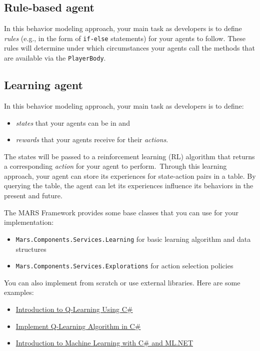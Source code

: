 \documentclass[a4paper,english,DIV=16,11pt,parskip=half,dvipsnames,listof=totoc,index=totoc,bibliography=totoc]{scrartcl}
\begin{document}
\subsection*{Rule-based agent}
In this behavior modeling approach, your main task as developers is to define \emph{rules} (e.g., in the form of \texttt{if-else} statements) for your agents to follow. These rules will determine under which circumstances your agents call the methods that are available via the \texttt{PlayerBody}.

\subsection*{Learning agent}
In this behavior modeling approach, your main task as developers is to define:
\begin{itemize}
  \item \emph{states} that your agents can be in and
  \item \emph{rewards} that your agents receive for their \emph{actions}.
\end{itemize}
The states will be passed to a reinforcement learning (RL) algorithm that returns a corresponding \emph{action} for your agent to perform.~Through this learning approach, your agent can store its experiences for state-action pairs in a table. By querying the table, the agent can let its experiences influence its behaviors in the present and future.

The MARS Framework provides some base classes that you can use for your implementation:
\begin{itemize}
  \item \texttt{Mars.Components.Services.Learning} for basic learning algorithm and data structures
  \item \texttt{Mars.Components.Services.Explorations} for action selection policies
\end{itemize}
You can also implement from scratch or use external libraries. Here are some examples:
\begin{itemize}
  \item \href{https://learn.microsoft.com/en-us/archive/msdn-magazine/2018/august/test-run-introduction-to-q-learning-using-csharp}{Introduction to Q-Learning Using C\#}
  \item \href{https://devindeep.com/how-to-implement-q-learning-algorithm-in-c/}{Implement Q-Learning Algorithm in C\#}
  \item \href{https://rubikscode.net/2022/08/29/machine-learning-with-ml-net-introduction/}{Introduction to Machine Learning with C\# and ML.NET}
\end{itemize}
\end{document}

